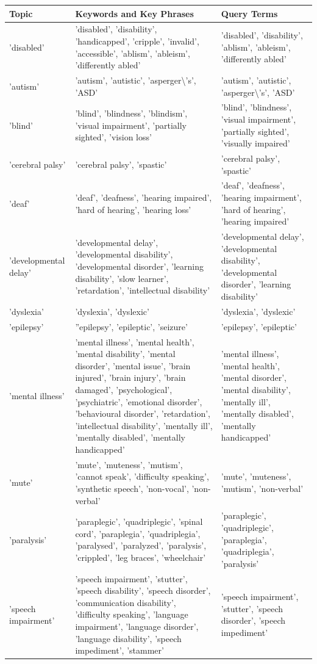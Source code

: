 \documentclass{report}
\begin{document}
\begin{longtabu} to \textwidth { | X[l] | X[l] | X[l] | } 
	\hline
	Topic & Keywords and Key Phrases & Query Terms \\ 
	\hline
	'disabled' & 'disabled', 'disability', 'handicapped', 'cripple', 'invalid', 'accessible', 'ablism', 'ableism', 'differently abled' & 'disabled', 'disability', 'ablism', 'ableism', 'differently abled' \\ 
	\hline
	'autism' & 'autism', 'autistic', 'asperger\textbackslash's', 'ASD' & 'autism', 'autistic', 'asperger\textbackslash's', 'ASD' \\ 
	\hline
	'blind' & 'blind', 'blindness', 'blindism', 'visual impairment', 'partially sighted', 'vision loss' & 'blind', 'blindness', 'visual impairment', 'partially sighted', 'visually impaired' \\ 
	\hline
	'cerebral palsy' & 'cerebral palsy', 'spastic' & 'cerebral palsy', 'spastic' \\ 
	\hline
	'deaf' & 'deaf', 'deafness', 'hearing impaired', 'hard of hearing', 'hearing loss' & 'deaf', 'deafness', 'hearing impairment', 'hard of hearing', 'hearing impaired' \\ 
	\hline
	'developmental delay' & 'developmental delay', 'developmental disability', 'developmental disorder', 'learning disability', 'slow learner', 'retardation', 'intellectual disability' & 'developmental delay', 'developmental disability', 'developmental disorder', 'learning disability' \\ 
	\hline
	'dyslexia' & 'dyslexia', 'dyslexic' & 'dyslexia', 'dyslexic' \\ 
	\hline
	'epilepsy' & ''epilepsy', 'epileptic', 'seizure' & 'epilepsy', 'epileptic' \\ 
	\hline
	'mental illness' & 'mental illness', 'mental health', 'mental disability', 'mental disorder', 'mental issue', 'brain injured', 'brain injury', 'brain damaged', 'psychological', 'psychiatric', 'emotional disorder', 'behavioural disorder', 'retardation', 'intellectual disability', 'mentally ill', 'mentally disabled', 'mentally handicapped' & 'mental illness', 'mental health', 'mental disorder', 'mental disability', 'mentally ill', 'mentally disabled', 'mentally handicapped' \\ 
	\hline
	'mute' & 'mute', 'muteness', 'mutism', 'cannot speak', 'difficulty speaking', 'synthetic speech', 'non-vocal', 'non-verbal' & 'mute', 'muteness', 'mutism', 'non-verbal' \\ 
	\hline
	'paralysis' & 'paraplegic', 'quadriplegic', 'spinal cord', 'paraplegia', 'quadriplegia', 'paralysed', 'paralyzed', 'paralysis', 'crippled', 'leg braces', 'wheelchair' & 'paraplegic', 'quadriplegic', 'paraplegia', 'quadriplegia', 'paralysis' \\ 
	\hline
	'speech impairment' & 'speech impairment', 'stutter', 'speech disability', 'speech disorder', 'communication disability', 'difficulty speaking', 'language impairment', 'language disorder', 'language disability', 'speech impediment', 'stammer' & 'speech impairment', 'stutter', 'speech disorder', 'speech impediment' \\ 
	\hline
\end{longtabu}
\end{document}
